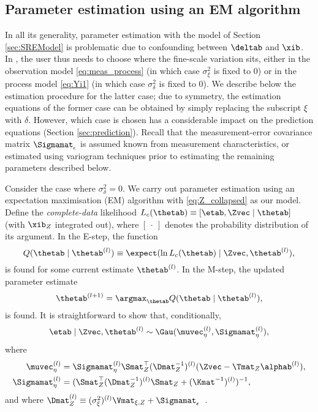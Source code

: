 \subsection{Parameter estimation using an EM algorithm} \label{sec:estimation}

In all its generality, parameter estimation with the model of Section \ref{sec:SREModel} is problematic due to confounding between $\deltab$ and $\xib$. In , the user thus needs to choose where the fine-scale variation sits, either in the observation model \eqref{eq:meas_process} (in which case $\sigma^2_\xi$ is fixed to 0) or in the process model \eqref{eq:Yi1} (in which case $\sigma^2_\delta$ is fixed to 0). We describe below the estimation procedure for the latter case; due to symmetry, the estimation equations of the former case can be obtained by simply replacing the subscript $\xi$ with $\delta$. However, which case is chosen has a considerable impact on the prediction equations (Section \ref{sec:prediction}). Recall that the measurement-error covariance matrix $\Sigmamat_\epsilon$ is assumed known from measurement characteristics, or estimated using variogram techniques prior to estimating the remaining parameters described below.

Consider the case where $\sigma^2_\delta = 0$. We carry out parameter estimation using an expectation maximisation (EM) algorithm \citep[similar to][]{Katzfuss_2011,Nguyen_2014} with \eqref{eq:Z_collapsed} as our model. Define the \emph{complete-data} likelihood $L_c(\thetab) \equiv [\etab,\Zvec \mid \thetab]$ (with $\xib_Z$ integrated out), where $[~\cdot~]$ denotes the probability distribution of its argument. In the E-step, the function
\begin{equation*}
Q(\thetab \mid \thetab^{(l)}) \equiv \expect(\ln L_c(\thetab) \mid \Zvec,\thetab^{(l)}),
\end{equation*}
is found for some current estimate $\thetab^{(l)}$. In the M-step, the updated parameter estimate
\begin{equation*}
\thetab^{(l+1)} = \argmax_\thetab Q(\thetab \mid \thetab^{(l)}),
\end{equation*}
is found. It is straightforward to show that, conditionally,
\begin{equation*}
\etab \mid \Zvec,\thetab^{(l)} \sim \Gau(\muvec_\eta^{(l)},\Sigmamat_\eta^{(l)}),
\end{equation*}
where
\begin{align*}
\muvec_\eta^{(l)} &= \Sigmamat_\eta^{(l)} \Smat_Z^\top(\Dmat_Z^{-1})^{(l)}(\Zvec - \Tmat_Z\alphab^{(l)}), \\
\Sigmamat_\eta^{(l)} &= (\Smat_Z^\top(\Dmat_Z^{-1})^{(l)}\Smat_Z + (\Kmat^{-1})^{(l)})^{-1},
\end{align*}
and where $\Dmat_Z^{(l)} \equiv (\sigma^2_\xi)^{(l)} \Vmat_{\xi,Z} + \Sigmamat_\epsilon$~.

